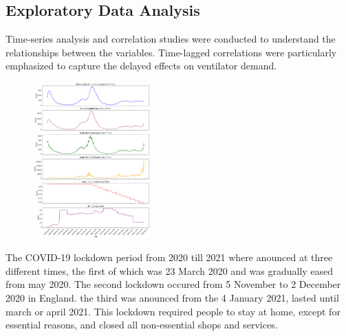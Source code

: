 \documentclass[lettersize, journal]{IEEEtran}
\begin{document}
\subsection{Exploratory Data Analysis}
Time-series analysis and correlation studies were conducted to understand the relationships between the variables. Time-lagged correlations were particularly emphasized to capture the delayed effects on ventilator demand.
\IEEEpubidadjcol
\begin{figure}[h]
    \centering
    \includegraphics[width=0.4\textwidth]{"../Research paper/images/trend_analysis_improved.pdf"}
\end{figure}

The COVID-19 lockdown period from 2020 till 2021 where anounced at three different times, the first of which was 23 March 2020 and was gradually eased from may 2020. The second lockdown occured from 5 November to 2 December 2020 in England. the third was anounced from the 4 January 2021, lasted until march or april 2021. This lockdown required people to stay at home, except for essential reasons, and closed all non-essential shops and services.

\end{document}
